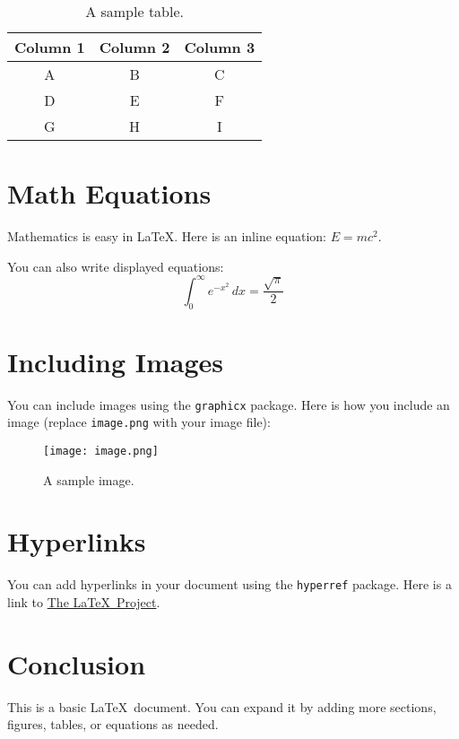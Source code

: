 \documentclass{article}
\begin{document}
\begin{table}[h!]
\centering
\begin{tabular}{|c|c|c|}
\hline
\textbf{Column 1} & \textbf{Column 2} & \textbf{Column 3} \\ \hline
A                & B                 & C                 \\ \hline
D                & E                 & F                 \\ \hline
G                & H                 & I                 \\ \hline
\end{tabular}
\caption{A sample table.}
\end{table}

\section{Math Equations}
Mathematics is easy in \LaTeX. Here is an inline equation: $E = mc^2$.

You can also write displayed equations:
\begin{equation}
\int_0^\infty e^{-x^2} \, dx = \frac{\sqrt{\pi}}{2}
\end{equation}

\section{Including Images}
You can include images using the \texttt{graphicx} package. Here is how you include an image (replace \texttt{image.png} with your image file):

\begin{figure}[h!]
    \centering
    \texttt{[image: image.png]}
    \caption{A sample image.}
\end{figure}

\section{Hyperlinks}
You can add hyperlinks in your document using the \texttt{hyperref} package. Here is a link to \href{https://www.latex-project.org}{The \LaTeX\ Project}.

\section{Conclusion}
This is a basic \LaTeX\ document. You can expand it by adding more sections, figures, tables, or equations as needed.
\end{document}
